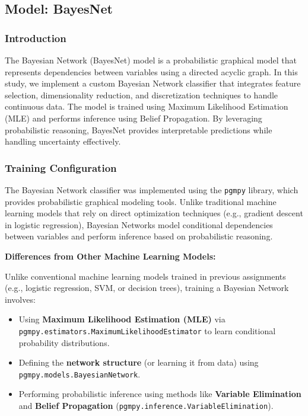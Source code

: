 \subsection{Model: BayesNet}

\subsubsection{Introduction}

The Bayesian Network (BayesNet) model is a probabilistic graphical model that represents dependencies between variables using a directed acyclic graph. In this study, we implement a custom Bayesian Network classifier that integrates feature selection, dimensionality reduction, and discretization techniques to handle continuous data. The model is trained using Maximum Likelihood Estimation (MLE) and performs inference using Belief Propagation. By leveraging probabilistic reasoning, BayesNet provides interpretable predictions while handling uncertainty effectively.

\subsubsection{Training Configuration}

The Bayesian Network classifier was implemented using the \texttt{pgmpy} library, which provides probabilistic graphical modeling tools. Unlike traditional machine learning models that rely on direct optimization techniques (e.g., gradient descent in logistic regression), Bayesian Networks model conditional dependencies between variables and perform inference based on probabilistic reasoning.

\textbf{Differences from Other Machine Learning Models:}  

Unlike conventional machine learning models trained in previous assignments (e.g., logistic regression, SVM, or decision trees), training a Bayesian Network involves:  

\begin{itemize}
    \item Using \textbf{Maximum Likelihood Estimation (MLE)} via \\
    \texttt{pgmpy.estimators.MaximumLikelihoodEstimator} to learn conditional probability distributions.
    \item Defining the \textbf{network structure} (or learning it from data) using \\
    \texttt{pgmpy.models.BayesianNetwork}.
    \item Performing probabilistic inference using methods like \textbf{Variable Elimination} and \textbf{Belief Propagation} (\texttt{pgmpy.inference.VariableElimination}).
\end{itemize}

